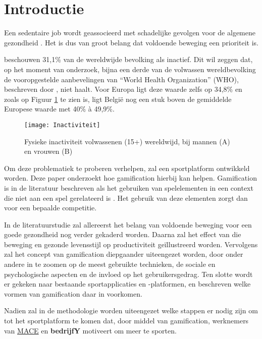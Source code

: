 
\section{Introductie}%
\label{sec:introductie}

Een sedentaire job wordt geassocieerd met schadelijke gevolgen voor de algemene gezondheid \autocite{Buckley2015}. Het is dus van groot belang dat voldoende beweging een prioriteit is.

\textcite{Hallal2012} beschouwen 31,1\% van de wereldwijde bevolking als inactief. Dit wil zeggen dat, op het moment van onderzoek, bijna een derde van de volwassen wereldbevolking de vooropgestelde aanbevelingen van ``World Health \linebreak Organization'' (WHO), beschreven door \textcite{Bull2020}, niet haalt. Voor Europa ligt deze waarde zelfs op 34,8\% en zoals op Figuur \ref{fig:inactivity} te zien is, ligt België nog een stuk boven de gemiddelde Europese waarde met 40\% à 49,9\%.

\begin{figure}[t]
    \caption{Fysieke inactiviteit volwassenen (15+) wereldwijd, bij mannen (A) en vrouwen (B) \autocite{Bull2020}}
    \texttt{[image: Inactiviteit]}
    \label{fig:inactivity}
\end{figure}

Om deze problematiek te proberen verhelpen, zal een sportplatform ontwikkeld worden. Deze paper onderzoekt hoe gamification hierbij kan helpen. Gamification is in de literatuur beschreven als het gebruiken van spelelementen in een context die niet aan een spel gerelateerd is \autocite{Gaalen2020}. Het gebruik van deze elementen zorgt dan voor een bepaalde competitie.

In de literatuurstudie zal allereerst het belang van voldoende beweging voor een goede gezondheid nog verder gekaderd worden. Daarna zal het effect van die beweging en gezonde levensstijl op productiviteit geïllustreerd worden. Vervolgens zal het concept van gamification diepgaander uiteengezet worden, door onder andere in te zoomen op de meest gebruikte technieken, de sociale en psychologische aspecten en de invloed op het gebruikersgedrag. Ten slotte wordt er gekeken naar bestaande sportapplicaties en -platformen, en beschreven welke vormen van gamification daar in voorkomen.

Nadien zal in de methodologie worden uiteengezet welke stappen er nodig zijn om tot het sportplatform te komen dat, door middel van gamification, werknemers van \href{https://www.mace-legal.com/}{MACE} en \textbf{bedrijfY} motiveert om meer te sporten.

